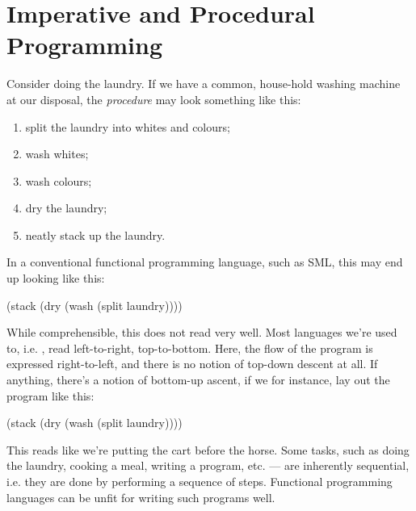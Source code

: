 \chapter{Imperative and Procedural Programming}

Consider doing the laundry. If we have a common, house-hold washing machine at
our disposal, the \emph{procedure} may look something like this:

\begin{enumerate}

\item split the laundry into whites and colours;

\item wash whites;

\item wash colours;

\item dry the laundry;

\item neatly stack up the laundry.

\end{enumerate}

In a conventional functional programming language, such as SML, this may end up
looking like this:

\begin{code}
(stack (dry (wash (split laundry))))
\end{code}

While comprehensible, this does not read very well. Most languages we're used
to, i.e. , read
left-to-right, top-to-bottom. Here, the flow of the program is expressed
right-to-left, and there is no notion of top-down descent at all. If anything,
there's a notion of bottom-up ascent, if we for instance, lay out the program
like this:

\begin{codebox}
\li (stack
\zi   (dry
\zi     (wash
\zi       (split laundry))))
\end{codebox}

This reads like we're putting the cart before the horse. Some tasks, such as
doing the laundry, cooking a meal, writing a program, etc. --- are inherently
sequential, i.e. they are done by performing a sequence of steps.  Functional
programming languages can be 
unfit for writing such programs well.

